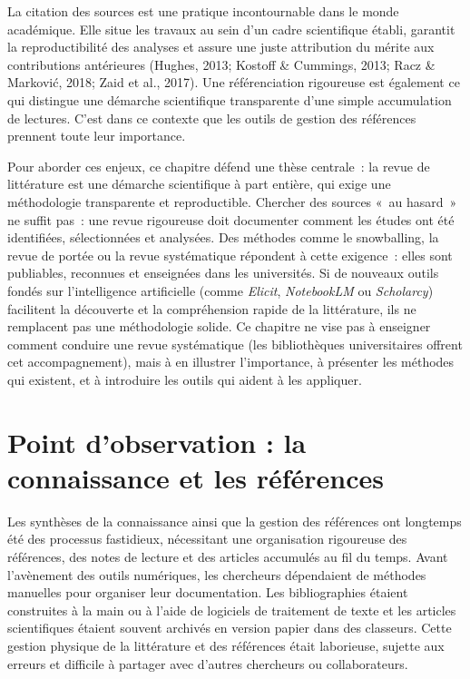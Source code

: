 \documentclass[
  letterpaper,
  DIV=11,
  numbers=noendperiod,
  oneside]{scrreprt}
\begin{document}
La citation des sources est une pratique incontournable dans le monde
académique. Elle situe les travaux au sein d'un cadre scientifique
établi, garantit la reproductibilité des analyses et assure une juste
attribution du mérite aux contributions antérieures (Hughes, 2013;
Kostoff \& Cummings, 2013; Racz \& Marković, 2018; Zaid et al., 2017).
Une référenciation rigoureuse est également ce qui distingue une
démarche scientifique transparente d'une simple accumulation de
lectures. C'est dans ce contexte que les outils de gestion des
références prennent toute leur importance.

Pour aborder ces enjeux, ce chapitre défend une thèse centrale~: la
revue de littérature est une démarche scientifique à part entière, qui
exige une méthodologie transparente et reproductible. Chercher des
sources «~au hasard~» ne suffit pas~: une revue rigoureuse doit
documenter comment les études ont été identifiées, sélectionnées et
analysées. Des méthodes comme le snowballing, la revue de portée ou la
revue systématique répondent à cette exigence~: elles sont publiables,
reconnues et enseignées dans les universités. Si de nouveaux outils
fondés sur l'intelligence artificielle (comme \emph{Elicit},
\emph{NotebookLM} ou \emph{Scholarcy}) facilitent la découverte et la
compréhension rapide de la littérature, ils ne remplacent pas une
méthodologie solide. Ce chapitre ne vise pas à enseigner comment
conduire une revue systématique (les bibliothèques universitaires
offrent cet accompagnement), mais à en illustrer l'importance, à
présenter les méthodes qui existent, et à introduire les outils qui
aident à les appliquer.

\hypertarget{point-dobservation-la-connaissance-et-les-ruxe9fuxe9rences}{%
\section{Point d'observation : la connaissance et les
références}\label{point-dobservation-la-connaissance-et-les-ruxe9fuxe9rences}}

Les synthèses de la connaissance ainsi que la gestion des références ont
longtemps été des processus fastidieux, nécessitant une organisation
rigoureuse des références, des notes de lecture et des articles
accumulés au fil du temps. Avant l'avènement des outils numériques, les
chercheurs dépendaient de méthodes manuelles pour organiser leur
documentation. Les bibliographies étaient construites à la main ou à
l'aide de logiciels de traitement de texte et les articles scientifiques
étaient souvent archivés en version papier dans des classeurs. Cette
gestion physique de la littérature et des références était laborieuse,
sujette aux erreurs et difficile à partager avec d'autres chercheurs ou
collaborateurs.
\end{document}
